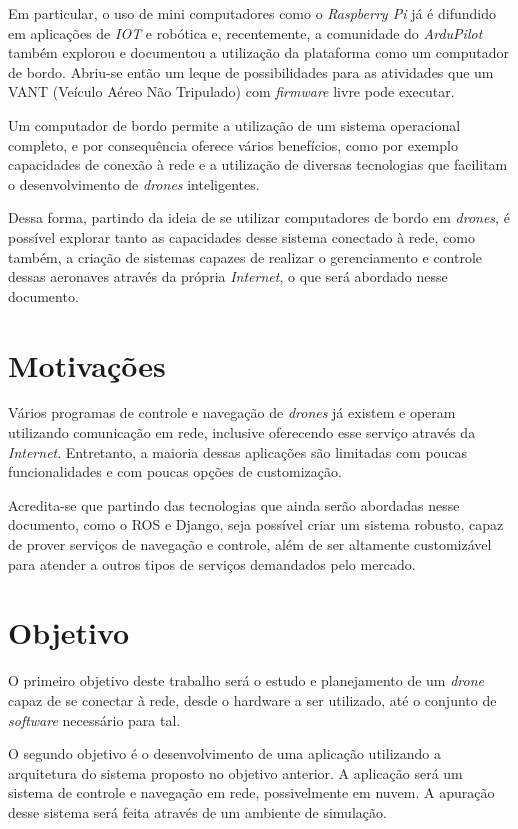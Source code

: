 \documentclass[12pt,a4paper,oneside]{book}
\begin{document}
Em particular, o uso de mini computadores como o \textit{Raspberry Pi} já é difundido em aplicações de \textit{IOT} e robótica e, recentemente, a comunidade do \textit{ArduPilot} também explorou e documentou a utilização da plataforma como um computador de bordo. Abriu-se então um leque de possibilidades para as atividades que um VANT (Veículo Aéreo Não Tripulado) com \textit{firmware} livre pode executar. 

Um computador de bordo permite a utilização de um sistema operacional completo, e por consequência oferece vários benefícios, como por exemplo capacidades de conexão à rede e a utilização de diversas tecnologias que facilitam o desenvolvimento de \textit{drones} inteligentes.

Dessa forma, partindo da ideia de se utilizar computadores de bordo em \textit{drones}, é possível explorar tanto as capacidades desse sistema conectado à rede, como também, a criação de sistemas capazes de realizar o gerenciamento e controle dessas aeronaves através da própria \textit{Internet}, o que será abordado nesse documento.

\section{Motivações}

Vários programas de controle e navegação de \textit{drones} já existem e operam utilizando comunicação em rede, inclusive oferecendo esse serviço através da \textit{Internet}. Entretanto, a maioria dessas aplicações são limitadas com poucas funcionalidades e com poucas opções de customização.

Acredita-se que partindo das tecnologias que ainda serão abordadas nesse documento, como o ROS e Django, seja possível criar um sistema robusto, capaz de prover serviços de navegação e controle, além de ser altamente customizável para atender a outros tipos de serviços demandados pelo mercado. 

\section{Objetivo}

O primeiro objetivo deste trabalho será o estudo e planejamento de um \textit{drone} capaz de se conectar à rede, desde o hardware a ser utilizado, até o conjunto de \textit{software} necessário para tal.

O segundo objetivo é o desenvolvimento de uma aplicação utilizando a arquitetura do sistema proposto no objetivo anterior. A aplicação será um sistema de controle e navegação em rede, possivelmente em nuvem. A apuração desse sistema será feita através de um ambiente de simulação.
\end{document}
